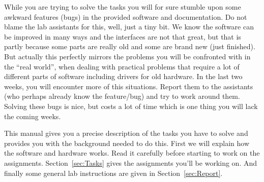 \documentclass[10pt]{scrartcl}
\begin{document}
While you are trying to solve the tasks you will for sure stumble upon
some awkward features (bugs) in the provided software and documentation.
Do not blame the lab assistants for this, well, just a tiny bit. We know
the software can be improved in many ways and the interfaces are not
that great, but that is partly because some parts are really old and 
some are brand new (just finished).
But actually this perfectly mirrors the problems you will be confronted
with in the ``real world'', when dealing with practical problems that
require a lot of different parts of software including drivers for old
hardware. In the last two weeks, you will encounter more of this situations.
Report them to the assistants (who perhaps already know the
feature/bug) and try to work around them. Solving these bugs is nice, but
costs a lot of time which is one thing you will lack the coming weeks.

This manual gives you a precise description of the tasks you have to
solve and provides you with the background needed to do this. First we
will explain how the software and hardware works. Read it carefully
before starting to work on the assignments.  Section~\ref{sec:Tasks}
gives the assignments you'll be working on. And finally some  general lab
instructions are given in Section~\ref{sec:Report}.

\end{document}
